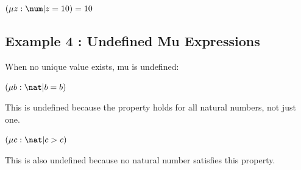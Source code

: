 \documentclass[a4paper,10pt,fleqn]{article}
\begin{document}
\noindent
$(\mu z : \num | z = 10) = 10$


\subsection*{Example 4 : Undefined Mu Expressions}

\noindent When no unique value exists, mu is undefined:

\bigskip

\noindent
$(\mu b : \nat | b = b)$


\noindent This is undefined because the property holds for all natural numbers, not just one.

\bigskip

\noindent
$(\mu c : \nat | c > c)$


\noindent This is also undefined because no natural number satisfies this property.

\bigskip
\end{document}
